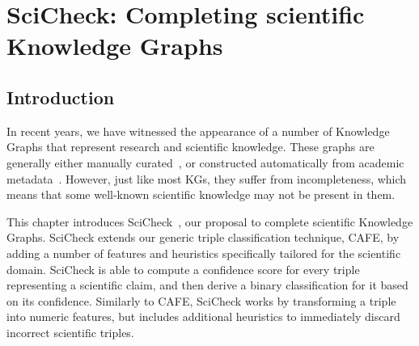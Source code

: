 \chapter{SciCheck: Completing scientific Knowledge Graphs}\label{chap:scicheck}



\section{Introduction}\label{sec:sci-intro}
In recent years, we have witnessed the appearance of a number of Knowledge Graphs that represent research and scientific knowledge. These graphs are generally either manually curated~\cite{jaradeh2019, bodenreider2004, kuhn2016}, or constructed automatically from academic metadata~\cite{dessi2020aikg, salatino2020, rossanez2020}. However, just like most KGs, they suffer from incompleteness, which means that some well-known scientific knowledge may not be present in them.

This chapter introduces SciCheck~\cite{borrego2022}, our proposal to complete scientific Knowledge Graphs. SciCheck extends our generic triple classification technique, CAFE, by adding a number of features and heuristics specifically tailored for the scientific domain. SciCheck is able to compute a confidence score for every triple representing a scientific claim, and then derive a binary classification for it based on its confidence. Similarly to CAFE, SciCheck works by transforming a triple into numeric features, but includes additional heuristics to immediately discard incorrect scientific triples.

